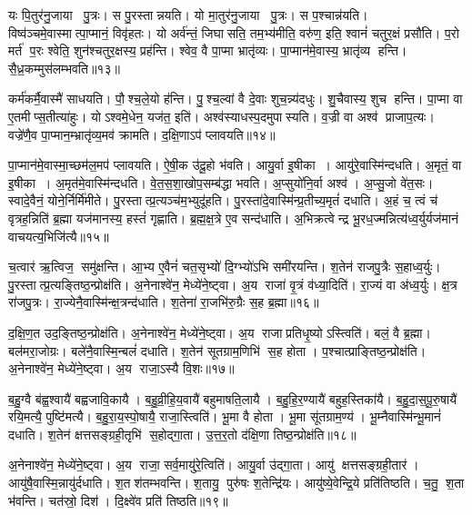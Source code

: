 यः पि॒तुर॑नु॒जाया पु॒त्रः।
स पु॒रस्तान्नयति।
यो मा॒तुर॑नु॒जाया पु॒त्रः।
स प॒श्चान्न॑यति।
विष्व॑ञ्चमे॒वास्मात्पा॒प्मानं॒ विवृ॑हतः।
यो अर्व॑न्तं॒ जिघासति॒ तम॒भ्य॑मीति॒ वरु॑ण॒ इति॒ श्वानं॑ चतुर॒क्षं प्रसौ॑ति।
प॒रो मर्त॑ प॒रः श्वेति॒ शुन॑श्चतुर॒क्षस्य॒ प्रह॑न्ति।
श्वेव॒ वै पा॒प्मा भ्रातृ॑व्यः।
पा॒प्मान॑मे॒वास्य॒ भ्रातृ॑व्य हन्ति।
सै॒ध्र॒कम्मुस॑लम्भवति॥१३॥

कर्म॑कर्मै॒वास्मै॑ साधयति।
पौ॒श्च॒ले॒यो ह॑न्ति।
पु॒श्च॒ल्वां वै दे॒वाः शुच॒न्न्य॑दधुः।
शु॒चैवास्य॒ शुच हन्ति।
पा॒प्मा वा ए॒तमीप्स॒तीत्या॑हुः।
योऽश्वमे॒धेन॒ यज॑त॒ इति॑।
अश्व॑स्याधस्प॒दमुपास्यति।
व॒ज्री वा अश्व॑ प्राजाप॒त्यः।
वज्रे॑णै॒व पा॒प्मान॒म्भ्रातृ॑व्य॒मव॑ क्रामति।
द॒क्षि॒णाऽप॑ प्लावयति॥१४॥

पा॒प्मान॑मे॒वास्मा॒च्छम॑ल॒मप॑ प्लावयति।
ऐ॒षी॒क उ॑दू॒हो भ॑वति।
आयु॒र्वा इ॒षीका।
आयु॑रे॒वास्मि॑न्दधति।
अ॒मृतं॒ वा इ॒षीका।
अ॒मृत॑मे॒वास्मि॑न्दधति।
वे॒त॒स॒शा॒खोप॒सम्ब॑द्धा भवति।
अ॒प्सुयो॑नि॒र्वा अश्व॑।
अ॒प्सु॒जो वे॑त॒सः।
स्वादे॒वैनं॒ योने॒र्निर्मि॑मीते।
पु॒रस्तात्प्र॒त्यञ्च॑म॒भ्युदू॑हति।
पु॒रस्ता॑दे॒वास्मि॑न्प्र॒तीच्य॒मृतं॑ दधाति।
अ॒हं च॒ त्वं च॑ वृत्रह॒न्निति॑ ब्र॒ह्मा यज॑मानस्य॒ हस्तं॑ गृह्णाति।
ब्र॒ह्म॒क्ष॒त्रे ए॒व सन्द॑धाति।
अ॒भिक्रत्वेन्द्र भू॒रध॒ज्मन्नित्य॑ध्व॒र्युर्यज॑मानं वाचयत्य॒भिजि॑त्यै॥१५॥\anuvakamend[भ॒व॒ति॒ प्ला॒व॒य॒ति॒ मि॒मी॒ते॒ पञ्च॑ च]

च॒त्वार॑ ऋ॒त्विज॒ समु॑क्षन्ति।
आ॒भ्य ए॒वैनं॑ चत॒सृभ्यो॑ दि॒ग्भ्यो॑ऽभि समी॑रयन्ति।
श॒तेन॑ राजपु॒त्रैः स॒हाध्व॒र्युः।
पु॒रस्तात्प्र॒त्यङ्तिष्ठ॒न्प्रोक्ष॑ति।
अ॒नेनाश्वे॑न॒ मेध्ये॑ने॒ष्ट्वा।
अ॒य राजा॑ वृ॒त्रं व॑ध्या॒दिति॑।
रा॒ज्यं वा अ॑ध्व॒र्युः।
क्ष॒त्र रा॑जपु॒त्रः।
रा॒ज्येनै॒वास्मि॑न्क्ष॒त्रन्द॑धाति।
श॒तेना॑ रा॒जभि॑रु॒ग्रैः स॒ह ब्र॒ह्मा॥१६॥

द॒क्षि॒ण॒त उद॒ङ्तिष्ठ॒न्प्रोक्ष॑ति।
अ॒नेनाश्वे॑न॒ मेध्ये॑ने॒ष्ट्वा।
अ॒य राजाप्रतिधृ॒ष्योऽस्त्विति॑।
बलं॒ वै ब्र॒ह्मा।
बल॑मरा॒जोग्रः।
बले॑नै॒वास्मि॒न्बलं॑ दधाति।
श॒तेन॑ सूतग्राम॒णिभि॑ स॒ह होता।
प॒श्चात्प्राङ्तिष्ठ॒न्प्रोक्ष॑ति।
अ॒नेनाश्वे॑न॒ मेध्ये॑ने॒ष्ट्वा।
अ॒य राजा॒ऽस्यै वि॒शः॥१७॥

ब॒हु॒ग्वै ब॑ह्व॒श्वायै॑ बह्वजावि॒कायै।
ब॒हु॒व्री॒हि॒य॒वायै॑ बहुमाषति॒लायै।
ब॒हु॒हि॒र॒ण्यायै॑ बहुह॒स्तिका॑यै।
ब॒हु॒दा॒स॒पू॒रु॒षायै॑ रयि॒मत्यै॒ पुष्टि॑मत्यै।
ब॒हु॒रा॒य॒स्पो॒षायै॒ राजा॒स्त्विति॑।
भू॒मा वै होता।
भू॒मा सू॑तग्राम॒ण्य॑।
भू॒म्नैवास्मि॑न्भू॒मानं॑ दधाति।
श॒तेन॑ क्षत्तसङ्ग्रही॒तृभि॑ स॒होद्गा॒ता।
उ॒त्त॒र॒तो द॑क्षि॒णा तिष्ठ॒न्प्रोक्ष॑ति॥१८॥

अ॒नेनाश्वे॑न॒ मेध्ये॑ने॒ष्ट्वा।
अ॒य राजा॒ सर्व॒मायु॑रे॒त्विति॑।
आयु॒र्वा उ॑द्गा॒ता।
आयु॑ क्षत्तसङ्ग्रही॒तार॑।
आयु॑षै॒वास्मि॒न्नायु॑र्दधाति।
श॒तश॑तम्भवन्ति।
श॒तायु॒ पुरु॑षः श॒तेन्द्रि॑यः।
आयु॑ष्ये॒वेन्द्रि॒ये प्रति॑तिष्ठति।
च॒तु॒ श॒ता भ॑वन्ति।
चत॑स्रो॒ दिश॑।
दि॒क्ष्वे॑व प्रति॑ तिष्ठति॥१९॥\anuvakamend[ब्र॒ह्मा वि॒श उ॑क्षति॒ दिश॒ एकं च]

